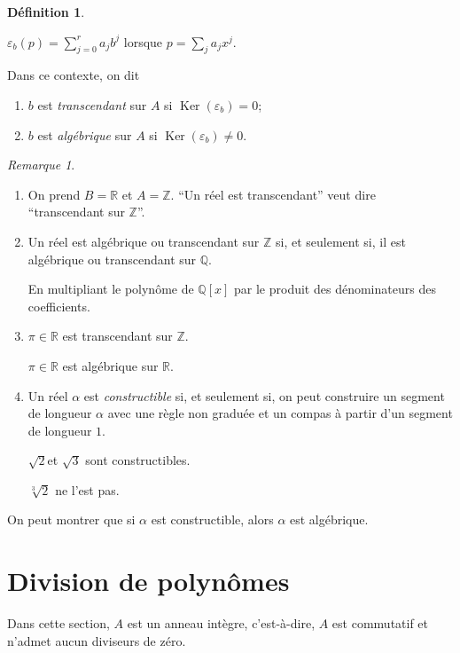 \documentclass{report}
\theoremstyle{definition}
\newtheorem*{dfn}{D\'efinition}
\theoremstyle{remark}
\newtheorem*{rmq}{Remarque}
\def\ZZ{\mathbb{Z}}
\def\QQ{\mathbb{Q}}
\def\RR{\mathbb{R}}
\def\noyau{\operatorname{Ker}}
\begin{document}
	\begin{dfn}~

		 $\varepsilon_b(p) = \sum_{j=0}^{r}a_jb^j$ lorsque $p=\sum_ja_jx^j$.

		Dans ce contexte, on dit
		\begin{enumerate}
			\item $b$ est \emph{transcendant} sur $A$ si $\noyau(\varepsilon_b)=0$;
			\item $b$ est \emph{alg\'ebrique} sur $A$ si $\noyau(\varepsilon_b)\neq0$.
		\end{enumerate}
	\end{dfn}

	\begin{rmq}~

		\begin{enumerate}
			\item On prend $B=\RR$ et $A=\ZZ$. ``Un r\'eel est transcendant'' veut dire ``transcendant sur $\ZZ$''.
			\item Un r\'eel est alg\'ebrique ou transcendant sur $\ZZ$ si, et seulement si, il est alg\'ebrique ou transcendant sur $\QQ$.

			En multipliant le polyn\^ome de $\QQ[x]$ par le produit des d\'enominateurs des coefficients.
			\item $\pi\in\RR$ est transcendant sur $\ZZ$.

			$\pi\in\RR$ est alg\'ebrique sur $\RR$.
			\item Un r\'eel $\alpha$ est \emph{constructible} si, et seulement si, on peut construire un segment de longueur $\alpha$ avec une r\`egle non gradu\'ee et un compas \`a partir d'un segment de longueur $1$.

			$\sqrt{2}$et $\sqrt{3}$ sont constructibles.

			$\sqrt[3]{2}$ ne l'est pas.
		\end{enumerate}

		On peut montrer que si $\alpha$ est constructible, alors $\alpha$ est alg\'ebrique.
	\end{rmq}

	\section{Division de polyn\^omes}
	Dans cette section, $A$ est un anneau int\`egre, c'est-\`a-dire, $A$ est commutatif et n'admet aucun diviseurs de z\'ero.
\end{document}

